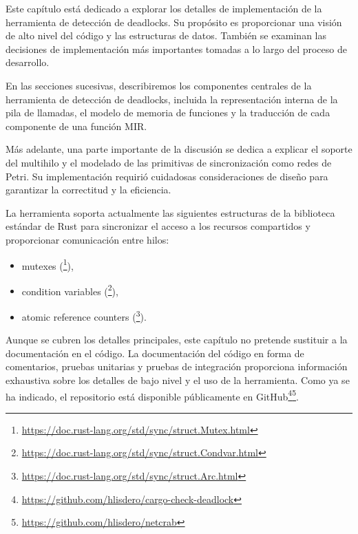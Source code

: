 Este capítulo está dedicado a explorar los detalles de implementación de la herramienta de
detección de deadlocks. Su propósito es proporcionar una visión de alto nivel del código y las
estructuras de datos. También se examinan las decisiones de implementación más
importantes tomadas a lo largo del proceso de desarrollo.

En las secciones sucesivas, describiremos los componentes centrales de la herramienta de
detección de deadlocks, incluida la representación interna de la pila de llamadas, el
modelo de memoria de funciones y la traducción de cada componente de una función \acrshort{MIR}.

Más adelante, una parte importante de la discusión se dedica a explicar el soporte del multihilo
y el modelado de las primitivas de sincronización como redes de Petri. Su implementación
requirió cuidadosas consideraciones de diseño para garantizar la correctitud y la eficiencia.

La herramienta soporta actualmente las siguientes estructuras de la biblioteca estándar de Rust
para sincronizar el acceso a los recursos compartidos y proporcionar comunicación entre hilos:

\begin{itemize}
  \item mutexes (\footnote{\url{https://doc.rust-lang.org/std/sync/struct.Mutex.html}}),
  \item condition variables (\footnote{\url{https://doc.rust-lang.org/std/sync/struct.Condvar.html}}),
  \item atomic reference counters (\footnote{\url{https://doc.rust-lang.org/std/sync/struct.Arc.html}}).
\end{itemize}

Aunque se cubren los detalles principales, este capítulo no pretende sustituir a la
documentación en el código. La documentación del código en forma de comentarios, pruebas
unitarias y pruebas de integración proporciona información exhaustiva sobre los detalles de
bajo nivel y el uso de la herramienta. Como ya se ha indicado, el repositorio está disponible
públicamente en
GitHub\footnote{\url{https://github.com/hlisdero/cargo-check-deadlock}}\footnote{\url{https://github.com/hlisdero/netcrab}}.